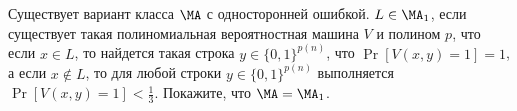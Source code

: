 Существует вариант класса $\MA$ с односторонней ошибкой. $L \in \MA_1$, если существует такая полиномиальная вероятностная
машина $V$ и полином $p$, что если $x \in L$, то найдется такая строка $y \in \{0, 1\}^{p(n)}$, что $\Pr[V(x, y) = 1] = 1$, а
если $x \notin L$, то для любой строки $y \in \{0, 1\}^{p(n)}$ выполняется $\Pr[V(x, y) = 1] < \frac{1}{3}$. Покажите, что
$\MA = \MA_1$.